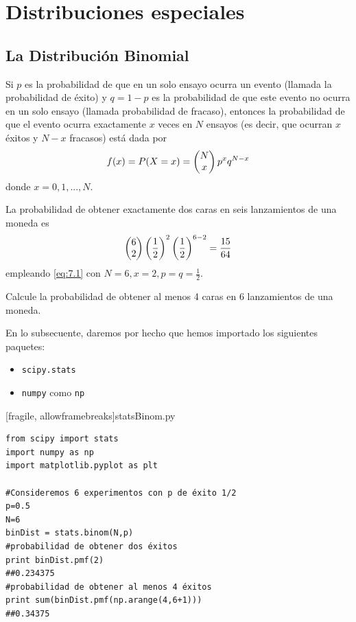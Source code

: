 \chapter{Distribuciones especiales}


\section{La Distribución Binomial}


 Si $p$ es la probabilidad de que en un solo ensayo ocurra un evento (llamada la probabilidad de éxito) y $q = 1 - p$ es la
probabilidad de que este evento no ocurra en un solo ensayo (llamada probabilidad de fracaso), entonces la probabilidad de que el evento ocurra exactamente $x$ veces en $N$ ensayos (es decir, que ocurran $x$ éxitos y $N - x$ fracasos) está
dada por
\begin{align}
 \label{eq:7.1}
 f(x)=P(X=x)=\begin{pmatrix} N \\ x\end{pmatrix}p^{x}q^{N-x}
\end{align}
donde $x=0,1,...,N.$


 \begin{ejemplo}
  \label{exmp:7.1}
  La probabilidad de obtener exactamente dos caras en seis lanzamientos de una moneda es
  \begin{align*}
   \begin{pmatrix} 6 \\ 2\end{pmatrix}\left( \dfrac{1}{2} \right)^{2}\left( \dfrac{1}{2} \right)^{6-2}=\dfrac{15}{64}
  \end{align*}
empleando \eqref{eq:7.1} con $N=6, x=2, p=q=\frac{1}{2}.$
 \end{ejemplo}



\begin{ejemplo}
 \label{exmp:7.2}
 Calcule la probabilidad de obtener al menos 4 caras en 6 lanzamientos de una moneda.
\end{ejemplo}



 En lo subsecuente, daremos por hecho que hemos importado los siguientes paquetes:
 \begin{itemize}
  \item \texttt{scipy.stats}
  \item \texttt{numpy} como \texttt{np}
 \end{itemize}


[fragile, allowframebreaks]{statsBinom.py}
\begin{verbatim}
from scipy import stats
import numpy as np
import matplotlib.pyplot as plt

#Consideremos 6 experimentos con p de éxito 1/2
p=0.5
N=6
binDist = stats.binom(N,p)
#probabilidad de obtener dos éxitos
print binDist.pmf(2)
##0.234375
#probabilidad de obtener al menos 4 éxitos
print sum(binDist.pmf(np.arange(4,6+1)))
##0.34375
 \end{verbatim}


